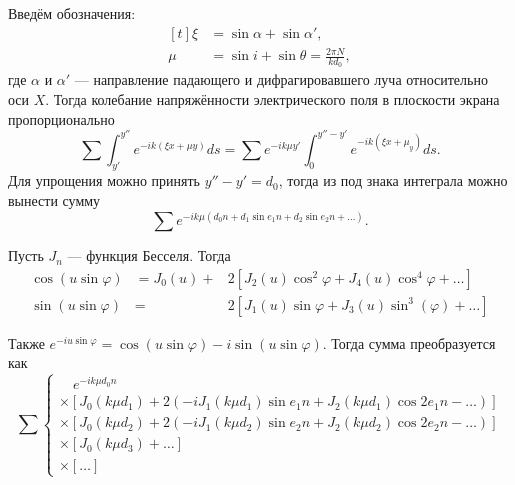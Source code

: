 \documentclass[a4paper, 12pt]{article}
\begin{document}
Введём обозначения:
\begin{equation} \label{eq:new_var}
\begin{aligned}[t]
\xi &= \sin{\alpha} + \sin{\alpha'}, \\
\mu &= \sin{i} + \sin{\theta} = \frac{2 \pi N}{k d_0},
\end{aligned}
\end{equation}
где $\alpha$ и $\alpha'$ --- направление падающего и дифрагировавшего луча относительно оси $X$. Тогда колебание напряжённости электрического поля в плоскости экрана пропорционально
\begin{equation} \label{eq:int}
\sum{\int_{y'}^{y''} e^{-i k(\xi x + \mu y)} ds} = \sum{e^{-i k \mu y'}} \int_{0}^{y'' - y'} e^{-i k(\xi x + \mu_y)} ds.
\end{equation}
Для упрощения можно принять $y'' - y' = d_0$, тогда из под знака интеграла можно вынести сумму
\begin{equation} \label{eq:err_sum}
\sum{e^{-i k \mu(d_0 n + d_1 \sin{e_1 n} + d_2 \sin{e_2 n} + \ldots)}}.
\end{equation}

Пусть $J_n$ --- функция Бесселя. Тогда 
\begin{equation} \label{eq:bess}
\begin{aligned}
\cos{(u \sin{\varphi})} &= J_0(u) + &2[J_2(u) \cos^2{\varphi} + J_4(u) \cos^4{\varphi} + \ldots] \\
\sin{(u \sin{\varphi})} &= &2[J_1(u) \sin{\varphi} + J_3(u) \sin^3{(\varphi)} + \ldots]
\end{aligned}
\end{equation}

Также $e^{-i u \sin{\varphi}} = \cos{(u \sin{\varphi})} - i \sin{(u \sin{\varphi})}$. Тогда сумма преобразуется как
\begin{equation} \label{eq:sum_bess}
\sum {}
	\begin{cases}
	\quad e^{-ik\mu d_0 n} \\
	\times [J_0(k\mu d_1) + 2(-i J_1(k \mu d_1) \sin{e_1 n} + J_2(k \mu d_1) \cos{2 e_1 n} - \ldots)] \\
	\times [J_0(k\mu d_2) + 2(-i J_1(k \mu d_2) \sin{e_2 n} + J_2(k \mu d_2) \cos{2 e_2 n} - \ldots)] \\
	\times [J_0(k \mu d_3) + \ldots] \\
	\times [\ldots]
	\end{cases}
\end{equation}
\end{document}
